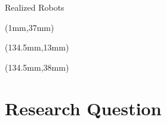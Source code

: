 \documentclass[11pt,aspectratio=169]{beamer}
\begin{document}
\begin{frame}[fragile]{Realized Robots}
        \begin{textblock*}{5cm}(1mm,37mm) %
        {\color{white} \tiny \cite{SHAPE}}
        \end{textblock*}

        \begin{textblock*}{5cm}(134.5mm,13mm) %
        {\color{white} \tiny \cite{william-bondin}}
        \end{textblock*}

        \begin{textblock*}{5cm}(134.5mm,38mm) %
        {\color{black} \tiny \cite{10.1145/3448326.3448332}}
        \end{textblock*}
 
\end{frame}


\section{Research Question}
\end{document}
